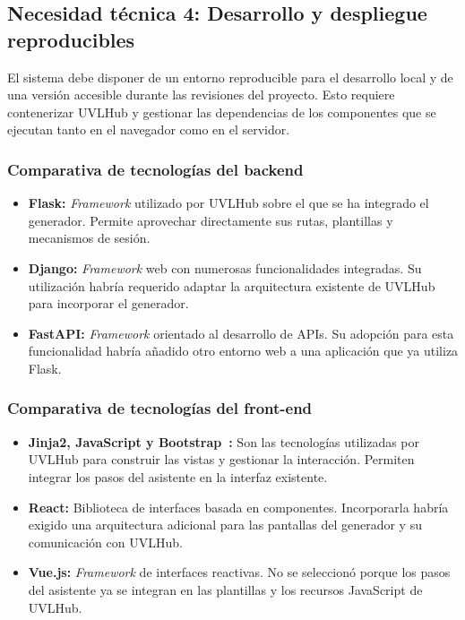 \subsection*{Necesidad técnica 4: Desarrollo y despliegue reproducibles}

El sistema debe disponer de un entorno reproducible para el desarrollo local y
de una versión accesible durante las revisiones del proyecto. Esto requiere
contenerizar UVLHub y gestionar las dependencias de los componentes que se
ejecutan tanto en el navegador como en el servidor.

\subsubsection*{Comparativa de tecnologías del backend}

\begin{itemize}
    \item \textbf{Flask:} \textit{Framework} utilizado por UVLHub sobre el que se
    ha integrado el generador. Permite aprovechar directamente sus rutas,
    plantillas y mecanismos de sesión.

    \item \textbf{Django:} \textit{Framework} web con numerosas funcionalidades
    integradas. Su utilización habría requerido adaptar la arquitectura
    existente de UVLHub para incorporar el generador.

    \item \textbf{FastAPI:} \textit{Framework} orientado al desarrollo de APIs.
    Su adopción para esta funcionalidad habría añadido otro entorno web a una
    aplicación que ya utiliza Flask.
\end{itemize}

\subsubsection*{Comparativa de tecnologías del front-end}

\begin{itemize}
    \item \textbf{Jinja2, JavaScript y Bootstrap~\cite{bootstrap}:} Son las
    tecnologías utilizadas por UVLHub para construir las vistas y gestionar
    la interacción. Permiten integrar los pasos del asistente en la interfaz
    existente.

    \item \textbf{React:} Biblioteca de interfaces basada en componentes.
    Incorporarla habría exigido una arquitectura adicional para las pantallas
    del generador y su comunicación con UVLHub.

    \item \textbf{Vue.js:} \textit{Framework} de interfaces reactivas. No se
    seleccionó porque los pasos del asistente ya se integran en las plantillas
    y los recursos JavaScript de UVLHub.
\end{itemize}

